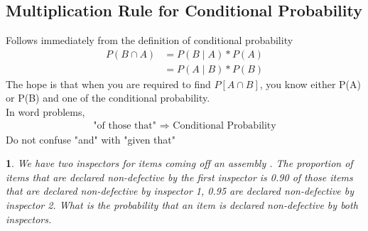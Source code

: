 \documentclass[11pt]{article}
\newtheorem{example}{\framebox{Ex}}[section]
\begin{document}
        \subsection{Multiplication Rule for Conditional Probability}
            Follows immediately from the definition of conditional probability
            \begin{align*}
                P(B \cap A) &= P(B \mid A)* P(A )\\
                            &=P(A \mid B) * P(B)
            \end{align*} 
            The hope is that when you are required to find $P[A\cap B]$, you know either P(A) or P(B) 
            and one of the conditional probability. 
            \\In word problems, 
            \begin{align*}
                \text{"of those that" } \Rightarrow \text{ Conditional Probability}
            \end{align*}
            Do not confuse "and" with "given that"

            \begin{example}
                We have two inspectors for items coming off an assembly . The proportion of items that are declared non-defective by the first inspector is 0.90
                of those items that are declared non-defective by inspector 1, 0.95 are declared non-defective by inspector 2. 
                What is the probability that an item is declared non-defective by both inspectors.
            \end{example}
\end{document}

